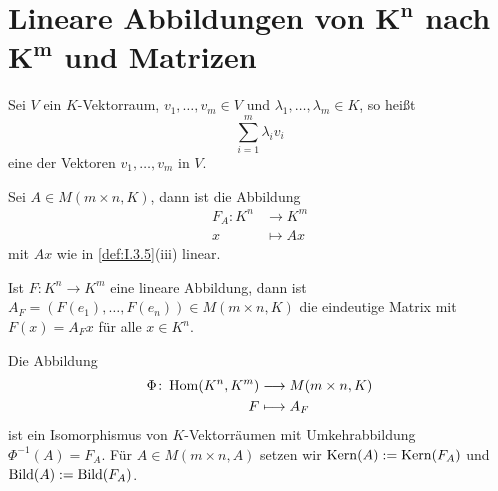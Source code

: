 \section{Lineare Abbildungen von $\mathbf{K^n}$ nach $\mathbf{K^m}$ und Matrizen}

\begin{definition}[Linearkombination]
	\label{def:I.6.1}
	Sei $V$ ein $K$-Vektorraum, $v_1,\dots,v_m \in V$ und $\lambda_1,\dots,\lambda_m \in K$, so heißt
	\[
		\sum_{i=1}^{m} \lambda_i v_i
	\]
	eine  der Vektoren $v_1,\dots,v_m$ in $V$.
\end{definition}

\setcounter{definition}{2}
\begin{lemma}
	\label{lemma:I.6.3}
	Sei $A \in M(m \times n,K)$, dann ist die Abbildung
	\begin{align*}
		F_A \colon K^n &\longrightarrow K^m \\
		x &\longmapsto Ax
	\end{align*}
	mit $Ax$ wie in \autoref{def:I.3.5}(iii) linear.
\end{lemma}

\begin{satz}
	\label{satz:I.6.4}
	Ist $F\colon K^n \rightarrow K^m$ eine lineare Abbildung, dann ist $A_F = (F(e_1),\dots,F(e_n)) \in M(m\times n,K)$ die eindeutige Matrix mit $F(x) = A_F x$ für alle $x \in K^n$.
\end{satz}

\setcounter{definition}{5}
\begin{satz}
	\label{satz:I.6.6}
	Die Abbildung
	\begin{align*}
		\Phi \colon \operatorname{Hom}(K^n,K^m) &\longrightarrow M(m \times n,K) \\
		F &\longmapsto A_F
	\end{align*}
	ist ein Isomorphismus von $K$-Vektorräumen mit Umkehrabbildung $\Phi^{-1}(A) = F_A$.
	Für $A \in M(m\times n,A)$ setzen wir $\operatorname{Kern}(A) := \operatorname{Kern}(F_A)$ und $\operatorname{Bild}(A) := \operatorname{Bild}(F_A)$.
\end{satz}

